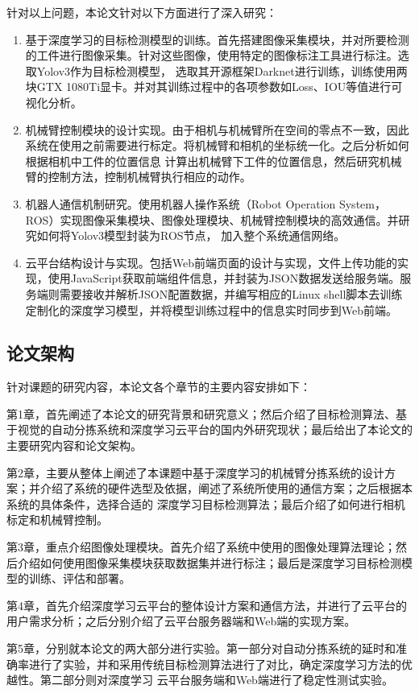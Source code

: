 针对以上问题，本论文针对以下方面进行了深入研究：
\begin{enumerate}
    \item{基于深度学习的目标检测模型的训练。首先搭建图像采集模块，并对所要检测的工件进行图像采集。针对这些图像，使用特定的图像标注工具进行标注。选取Yolov3作为目标检测模型，
    选取其开源框架Darknet进行训练，训练使用两块GTX 1080Ti显卡。并对其训练过程中的各项参数如Loss、IOU等值进行可视化分析。}
    \item{机械臂控制模块的设计实现。由于相机与机械臂所在空间的零点不一致，因此系统在使用之前需要进行标定。将机械臂和相机的坐标统一化。之后分析如何根据相机中工件的位置信息
    计算出机械臂下工件的位置信息，然后研究机械臂的控制方法，控制机械臂执行相应的动作。}
    \item{机器人通信机制研究。使用机器人操作系统（Robot Operation System，ROS）实现图像采集模块、图像处理模块、机械臂控制模块的高效通信。并研究如何将Yolov3模型封装为ROS节点，
    加入整个系统通信网络。}
    \item{云平台结构设计与实现。包括Web前端页面的设计与实现，文件上传功能的实现，使用JavaScript获取前端组件信息，并封装为JSON数据发送给服务端。服务端则需要接收并解析JSON配置数据，并编写相应的Linux
     shell脚本去训练定制化的深度学习模型，并将模型训练过程中的信息实时同步到Web前端。}
\end{enumerate}

\subsection{论文架构}
针对课题的研究内容，本论文各个章节的主要内容安排如下：

第1章，首先阐述了本论文的研究背景和研究意义；然后介绍了目标检测算法、基于视觉的自动分拣系统和深度学习云平台的国内外研究现状；最后给出了本论文的主要研究内容和论文架构。

第2章，主要从整体上阐述了本课题中基于深度学习的机械臂分拣系统的设计方案；并介绍了系统的硬件选型及依据，阐述了系统所使用的通信方案；之后根据本系统的具体条件，选择合适的
深度学习目标检测算法；最后介绍了如何进行相机标定和机械臂控制。

第3章，重点介绍图像处理模块。首先介绍了系统中使用的图像处理算法理论；然后介绍如何使用图像采集模块获取数据集并进行标注；最后是深度学习目标检测模型的训练、评估和部署。

第4章，首先介绍深度学习云平台的整体设计方案和通信方法，并进行了云平台的用户需求分析；之后分别介绍了云平台服务器端和Web端的实现方案。

第5章，分别就本论文的两大部分进行实验。第一部分对自动分拣系统的延时和准确率进行了实验，并和采用传统目标检测算法进行了对比，确定深度学习方法的优越性。第二部分则对深度学习
云平台服务端和Web端进行了稳定性测试实验。

